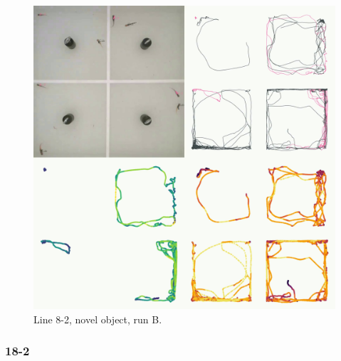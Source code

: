 \documentclass[
]{book}
\begin{document}
\begin{figure}
\includegraphics[width=1\linewidth]{figs/mikk_behaviour/four_panel_plots/novel_object_20191118_1224_8-2_R_B_300} \caption{Line 8-2, novel object, run B.}\label{fig:4p-8-2-no-B}
\end{figure}

\hypertarget{section-8}{%
\subsubsection{18-2}\label{section-8}}
\end{document}
